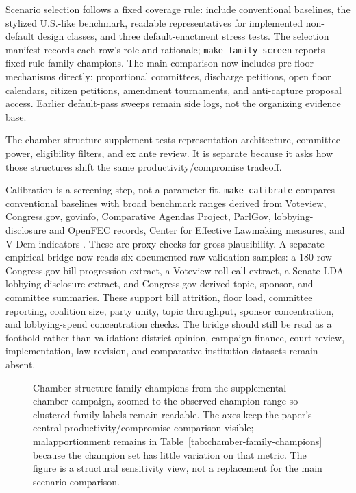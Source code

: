 \documentclass[manuscript,review,anonymous]{acmart}
\begin{document}
Scenario selection follows a fixed coverage rule: include conventional baselines, the stylized U.S.-like benchmark, readable representatives for implemented non-default design classes, and three default-enactment stress tests. The selection manifest records each row's role and rationale; \texttt{make family-screen} reports fixed-rule family champions. The main comparison now includes pre-floor mechanisms directly: proportional committees, discharge petitions, open floor calendars, citizen petitions, amendment tournaments, and anti-capture proposal access. Earlier default-pass sweeps remain side logs, not the organizing evidence base.

The chamber-structure supplement tests representation architecture, committee power, eligibility filters, and ex ante review. It is separate because it asks how those structures shift the same productivity/compromise tradeoff.

Calibration is a screening step, not a parameter fit. \texttt{make calibrate} compares conventional baselines with broad benchmark ranges derived from Voteview, Congress.gov, govinfo, Comparative Agendas Project, ParlGov, lobbying-disclosure and OpenFEC records, Center for Effective Lawmaking measures, and V-Dem indicators \citep{Voteview2021,CongressGovData,GovinfoBillStatus2020,ComparativeAgendasProject,ParlGov2024,SenateLDA,OpenFECData,VoldenWiseman2014,VDemDataset}. These are proxy checks for gross plausibility. A separate empirical bridge now reads six documented raw validation samples: a 180-row Congress.gov bill-progression extract, a Voteview roll-call extract, a Senate LDA lobbying-disclosure extract, and Congress.gov-derived topic, sponsor, and committee summaries. These support bill attrition, floor load, committee reporting, coalition size, party unity, topic throughput, sponsor concentration, and lobbying-spend concentration checks. The bridge should still be read as a foothold rather than validation: district opinion, campaign finance, court review, implementation, law revision, and comparative-institution datasets remain absent.




\begin{figure}
  \centering
  
  \caption{Chamber-structure family champions from the supplemental chamber campaign, zoomed to the observed champion range so clustered family labels remain readable. The axes keep the paper's central productivity/compromise comparison visible; malapportionment remains in Table~\ref{tab:chamber-family-champions} because the champion set has little variation on that metric. The figure is a structural sensitivity view, not a replacement for the main scenario comparison.}
  \label{fig:chamber-productivity-compromise}
\end{figure}
\end{document}
